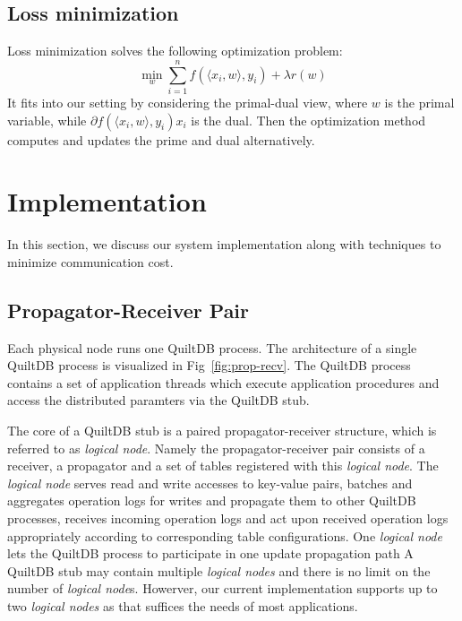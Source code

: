 \documentclass{acm_proc_article-sp}
\begin{document}
\subsection{Loss minimization}

Loss minimization solves the following optimization problem:
\begin{equation}
  \min_w \sum_{i=1}^{n} f(\langle x_i, w\rangle, y_i) + \lambda r(w)
\end{equation}
It fits into our setting by considering the primal-dual view, where $w$ is the primal
variable, while $\partial f(\langle x_i, w\rangle, y_i) x_i$ is the dual. Then
the optimization method computes and updates the prime and dual alternatively.

\section{Implementation}
In this section, we discuss our system implementation along with techniques to 
minimize communication cost.

\subsection{Propagator-Receiver Pair}

Each physical node runs one QuiltDB process. The architecture of a single 
QuiltDB process is visualized in Fig~\ref{fig:prop-recv}.  The QuiltDB process
contains a set of application threads which execute application procedures and 
access the distributed paramters via the QuiltDB stub. 

The core of a QuiltDB stub is a paired propagator-receiver structure, which is 
referred to as \emph{logical node}. Namely the propagator-receiver pair consists
of a receiver, a propagator and a set of tables registered with this 
\emph{logical node}. The \emph{logical node} serves read and write accesses to 
key-value pairs, batches and aggregates operation logs for writes and propagate 
them to other QuiltDB processes, receives incoming operation logs and act upon 
received operation logs appropriately according to corresponding table 
configurations. One \emph{logical node} lets the QuiltDB process to participate 
in one update propagation path
A QuiltDB stub may contain multiple \emph{logical nodes} and 
there is no limit on the number of \emph{logical node}s. Howerver, our current 
implementation supports up to two \emph{logical nodes} as that suffices the 
needs of most applications.
\end{document}
